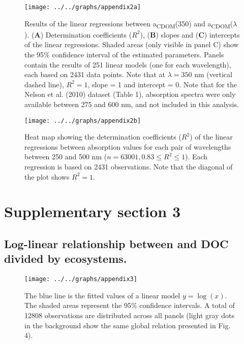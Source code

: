 \documentclass[12pt,a4paper]{scrartcl}
\begin{document}


\begin{figure}[h]
	\ContinuedFloat*
	\centering
	\texttt{[image: ../../graphs/appendix2a]}
	\caption{\label{first}Results of the linear regressions between a\textsubscript{CDOM}(350) and a\textsubscript{CDOM}($\lambda$). (\textbf{A}) Determination coefficients ($R^2$), (\textbf{B}) slopes and (\textbf{C}) intercepts of the linear regressions. Shaded areas (only visible in panel C) show the 95\% confidence interval of the estimated parameters. Panels contain the results of 251 linear models (one for each wavelength), each based on 2431 data points. Note that at $\lambda = 350$ nm (vertical dashed line), $R^2 = 1$, slope = 1 and intercept = 0. Note that for the Nelson et al. (2010) dataset (Table 1), absorption spectra were only available between 275 and 600 nm, and not included in this analysis.}
\end{figure}

\begin{figure}[h]
	\ContinuedFloat
	\centering
	\texttt{[image: ../../graphs/appendix2b]}
	\caption{\label{second}Heat map showing the determination coefficients ($R^2$) of the linear regressions between absorption values for each pair of wavelengths between 250 and 500 nm ($n = 63001, 0.83 \le R^2 \le 1$). Each regression is based on 2431 observations. Note that the diagonal of the plot shows $R^2 = 1$. }
\end{figure}

\clearpage
\newpage

\section*{Supplementary section 3}
\subsection*{Log-linear relationship between  and DOC divided by ecosystems.}

\begin{figure}[h]
	\centering
	\texttt{[image: ../../graphs/appendix3]}
	\caption{The blue line is the fitted values of a linear model $y = \log(x)$. The shaded areas represent the 95\% confidence intervals. A total of 12808 observations are distributed across all panels (light gray dots in the background show the same global relation presented in Fig. 4).}
\end{figure}
\end{document}
